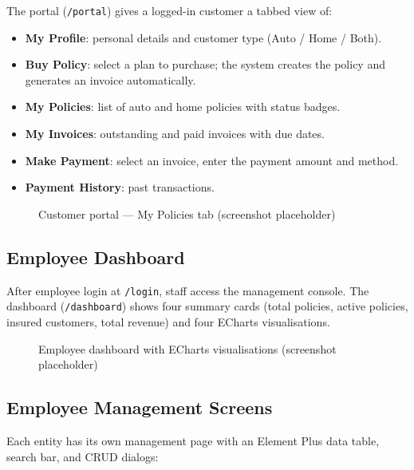 \documentclass[12pt,letterpaper]{article}
\begin{document}
The portal (\texttt{/portal}) gives a logged-in customer a tabbed view of:
\begin{itemize}
  \item \textbf{My Profile}: personal details and customer type (Auto / Home / Both).
  \item \textbf{Buy Policy}: select a plan to purchase; the system creates the policy and generates an invoice automatically.
  \item \textbf{My Policies}: list of auto and home policies with status badges.
  \item \textbf{My Invoices}: outstanding and paid invoices with due dates.
  \item \textbf{Make Payment}: select an invoice, enter the payment amount and method.
  \item \textbf{Payment History}: past transactions.
\end{itemize}

\begin{figure}[H]
  \centering
  \fbox{\rule{0pt}{5cm}\rule{0.8\linewidth}{0pt}}
  \caption{Customer portal --- My Policies tab (screenshot placeholder)}
\end{figure}

\subsection{Employee Dashboard}

After employee login at \texttt{/login}, staff access the management console. The dashboard (\texttt{/dashboard}) shows four summary cards (total policies, active policies, insured customers, total revenue) and four ECharts visualisations.

\begin{figure}[H]
  \centering
  \fbox{\rule{0pt}{5cm}\rule{0.8\linewidth}{0pt}}
  \caption{Employee dashboard with ECharts visualisations (screenshot placeholder)}
\end{figure}

\subsection{Employee Management Screens}

Each entity has its own management page with an Element Plus data table, search bar, and CRUD dialogs:
\end{document}
